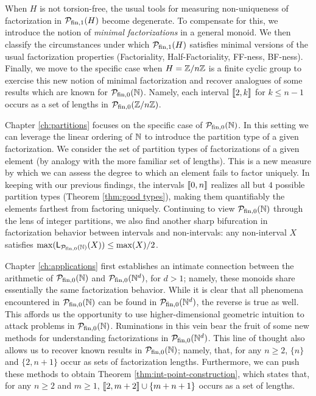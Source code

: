 When $H$ is not torsion-free, the usual tools for measuring non-uniqueness of factorization in $\mathcal{P}_{\textrm{fin}, 1}(H)$ become degenerate.
To compensate for this, we introduce the notion of \textit{minimal factorizations} in a general monoid.
We then classify the circumstances under which $\mathcal{P}_{\textrm{fin}, 1}(H)$ satisfies minimal versions of the usual factorization properties (Factoriality, Half-Factoriality, FF-ness, BF-ness).  
Finally, we move to the specific case when $H = \mathbb{Z}/n\mathbb{Z}$ is a finite cyclic group to exercise this new notion of minimal factorization and recover analogues of some results which are known for ${\mathcal{P}_{\textrm{fin},0}(\mathbb{N})}$.
Namely, each interval $\llbracket 2,k \rrbracket$ for $k\le n-1$ occurs as a set of lengths in $\mathcal{P}_{\textrm{fin}, 0}(\mathbb{Z}/n\mathbb{Z})$.

Chapter \ref{ch:partitions} focuses on the specific case of ${\mathcal{P}_{\textrm{fin},0}(\mathbb{N})}$.
In this setting we can leverage the linear ordering of $\mathbb{N}$ to introduce the partition type of a given factorization.  
We consider the set of partition types of factorizations of a given element (by analogy with the more familiar set of lengths).
This is a new measure by which we can assess the degree to which an element fails to factor uniquely.  
In keeping with our previous findings, the intervals $\llbracket 0,n \rrbracket$ realizes all but $4$ possible partition types (Theorem \ref{thm:good types}), making them quantifiably the elements farthest from factoring uniquely.
Continuing to view ${\mathcal{P}_{\textrm{fin},0}(\mathbb{N})}$ through the lens of integer partitions, we also find another sharp bifurcation in factorization behavior between intervals and non-intervals: any non-interval $X$ satisfies $\max(\mathsf{L}_{{\mathcal{P}_{\textrm{fin},0}(\mathbb{N})}}(X) )\le \max(X)/2$.

Chapter \ref{ch:applications} first establishes an intimate connection between the arithmetic of ${\mathcal{P}_{\textrm{fin},0}(\mathbb{N})}$ and $\mathcal{P}_{\textrm{fin}, 0}(\mathbb{N}^d)$, for $d>1$; namely, these monoids share essentially the same factorization behavior.  
While it is clear that all phenomena encountered in ${\mathcal{P}_{\textrm{fin},0}(\mathbb{N})}$ can be found in $\mathcal{P}_{\textrm{fin}, 0}(\mathbb{N}^d)$, the reverse is true as well.  
This affords us the opportunity to use higher-dimensional geometric intuition to attack problems in ${\mathcal{P}_{\textrm{fin},0}(\mathbb{N})}$.
Ruminations in this vein bear the fruit of some new methods for understanding factorizations in $\mathcal{P}_{\textrm{fin}, 0}(\mathbb{N}^d)$.
This line of thought also allows us to recover known results in ${\mathcal{P}_{\textrm{fin},0}(\mathbb{N})}$; namely, that, for any $n\ge 2$, $\{n\}$ and $\{2,n+1\}$ occur as sets of factorization lengths.
Furthermore, we can push these methods to obtain Theorem \ref{thm:int-point-construction}, which states that, for any $n\ge 2$ and $m\ge 1$, $\llbracket 2,m+2 \rrbracket \cup \{m+n+1\}$ occurs as a set of lengths.





